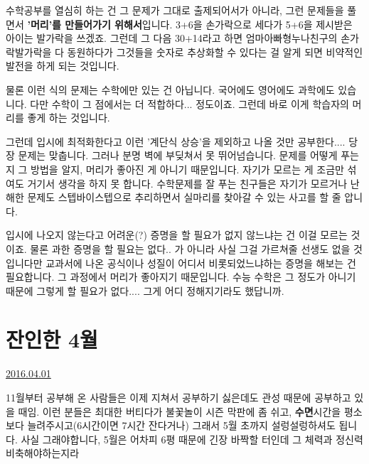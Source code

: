 수학공부를 열심히 하는 건 그 문제가 그대로 출제되어서가 아니라,
그런 문제들을 풀면서 \textbf{'머리'를 만들어가기 위해서}입니다.
3+6을 손가락으로 세다가 5+6을 제시받은 아이는 발가락을 쓰겠죠.
그런데 그 다음 30+14라고 하면 엄마아빠형누나친구의 손가락발가락을 다 동원하다가
그것들을 숫자로 추상화할 수 있다는 걸 알게 되면 비약적인 발전을 하게 되는 것입니다.
\vspace{5mm}

물론 이런 식의 문제는 수학에만 있는 건 아닙니다. 국어에도 영어에도 과학에도 있습니다.
다만 수학이 그 점에서는 더 적합하다... 정도이죠. 그런데 바로 이게 학습자의 머리를 좋게 하는 것입니다.
\vspace{5mm}

그런데 입시에 최적화한다고 이런 '계단식 상승'을 제외하고 나올 것만 공부한다.... 당장 문제는 맞춥니다.
그러나 분명 벽에 부딪쳐서 못 뛰어넘습니다. 문제를 어떻게 푸는지 그 방법을 알지, 머리가 좋아진 게 아니기 때문입니다.
자기가 모르는 게 조금만 섞여도 거기서 생각을 하지 못 합니다.
수학문제를 잘 푸는 친구들은 자기가 모르거나 난해한 문제도 스텝바이스텝으로 추리하면서 실마리를 찾아갈 수 있는 사고를 할 줄 압니다.
\vspace{5mm}

입시에 나오지 않는다고 어려운(?) 증명을 할 필요가 없지 않느냐는 건 이걸 모르는 것이죠.
물론 과한 증명을 할 필요는 없다.. 가 아니라 사실 그걸 가르쳐줄 선생도 없을 것입니다만
교과서에 나온 공식이나 성질이 어디서 비롯되었느냐하는 증명을 해보는 건 필요합니다. 그 과정에서 머리가 좋아지기 때문입니다.
수능 수학은 그 정도가 아니기 때문에 그렇게 할 필요가 없다.... 그게 어디 정해지기라도 했답니까.
\vspace{5mm}






\section{잔인한 4월}
\href{https://www.kockoc.com/Apoc/706818}{2016.04.01}

\vspace{5mm}

11월부터 공부해 온 사람들은 이제 지쳐서 공부하기 싫은데도 관성 때문에 공부하고 있을 때임.
이런 분들은 최대한 버티다가 불꽃놀이 시즌 막판에 좀 쉬고, \textbf{수면}시간을 평소보다 늘려주시고(6시간이면 7시간 잔다거나)
그래서 5월 초까지 설렁설렁하셔도 됩니다. 사실 그래야합니다, 5월은 어차피 6평 때문에 긴장 바짝할 터인데 그 체력과 정신력 비축해야하는지라
\vspace{5mm}


